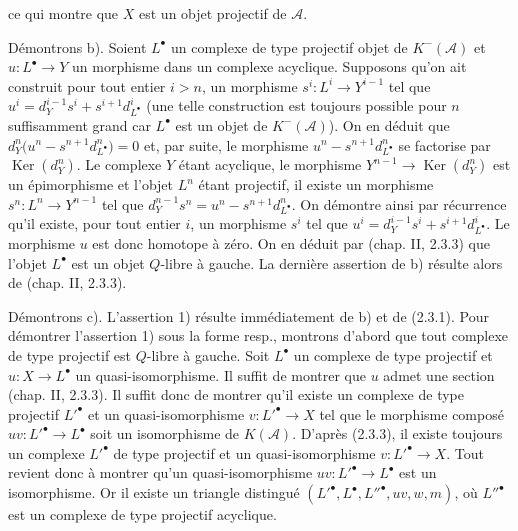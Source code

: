 \clearpage
{}%
\begingroup\small\setlength{\parskip}{0pt}\setlength{\emergencystretch}{1.5em}
\setlength{\abovedisplayskip}{4pt plus 2pt minus 2pt}%
\setlength{\belowdisplayskip}{4pt plus 2pt minus 2pt}%

ce qui montre que $X$ est un objet projectif de $\mathcal A$.

Démontrons b). Soient $L^\bullet$ un complexe de type projectif objet de
$K^{-}(\mathcal A)$ et $u\colon L^\bullet\longrightarrow Y$ un morphisme
dans un complexe acyclique. Supposons qu'on ait construit pour tout entier
$i>n$, un morphisme $s^i\colon L^i\longrightarrow Y^{i-1}$ tel que
$u^i=d_Y^{i-1}s^i+s^{i+1}d_{L^\bullet}^{i}$ (une telle construction est
toujours possible pour $n$ suffisamment grand
car $L^\bullet$ est un objet de $K^{-}(\mathcal A)$). On en déduit que
$d_Y^n\bigl(u^n-s^{n+1}d_{L^\bullet}^{n}\bigr)=0$ et, par suite, le morphisme
$u^n-s^{n+1}d_{L^\bullet}^{n}$ se factorise par
$\operatorname{Ker}(d_Y^n)$. Le complexe $Y$ étant acyclique, le morphisme
$Y^{n-1}\longrightarrow\operatorname{Ker}(d_Y^n)$ est un épimorphisme et
l'objet $L^n$ étant projectif, il existe un morphisme
$s^n\colon L^n\longrightarrow Y^{n-1}$ tel que
$d_Y^{n-1}s^n=u^n-s^{n+1}d_{L^\bullet}^{n}$.
On démontre ainsi par récurrence qu'il existe, pour tout entier $i$, un
morphisme $s^i$ tel que
$u^i=d_Y^{i-1}s^i+s^{i+1}d_{L^\bullet}^{i}$. Le morphisme $u$ est donc
homotope à zéro. On en déduit par (chap. II, 2.3.3) que l'objet $L^\bullet$
est un objet $Q$-libre à gauche. La dernière assertion de b) résulte alors
de (chap. II, 2.3.3).

Démontrons c). L'assertion 1) résulte immédiatement de b) et de (2.3.1).
Pour démontrer l'assertion 1) sous la forme resp{.}, montrons d'abord que tout
complexe de type projectif est $Q$-libre à gauche. Soit $L^\bullet$ un
complexe de type projectif et
$u\colon X\longrightarrow L^\bullet$ un quasi-isomorphisme. Il
suffit de montrer que $u$ admet une section (chap. II, 2.3.3). Il
suffit donc de montrer qu'il existe un complexe de type projectif
${L'}^\bullet$ et un quasi-isomorphisme
$v\colon {L'}^\bullet\longrightarrow X$ tel que le morphisme composé
$uv\colon {L'}^\bullet\longrightarrow L^\bullet$ soit un
isomorphisme de $K(\mathcal A)$. D'après (2.3.3), il existe toujours un
complexe ${L'}^\bullet$ de type projectif et un quasi-isomorphisme
$v\colon {L'}^\bullet\longrightarrow X$. Tout revient donc à montrer qu'un
quasi-isomorphisme
$uv\colon {L'}^\bullet\longrightarrow L^\bullet$ est un
isomorphisme. Or il existe un triangle distingué
$({L'}^\bullet,L^\bullet,{L''}^\bullet,uv,w,m)$, où
${L''}^\bullet$ est un complexe de type projectif acyclique.

